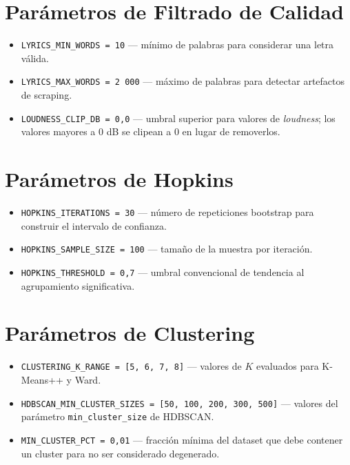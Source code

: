 \section{Parámetros de Filtrado de Calidad}

\begin{itemize}[leftmargin=2em]
    \item \texttt{LYRICS\_MIN\_WORDS = 10} --- mínimo de palabras para considerar una letra válida.
    \item \texttt{LYRICS\_MAX\_WORDS = 2\,000} --- máximo de palabras para detectar artefactos de scraping.
    \item \texttt{LOUDNESS\_CLIP\_DB = 0{,}0} --- umbral superior para valores de \textit{loudness}; los valores mayores a 0 dB se clipean a 0 en lugar de removerlos.
\end{itemize}

\section{Parámetros de Hopkins}

\begin{itemize}[leftmargin=2em]
    \item \texttt{HOPKINS\_ITERATIONS = 30} --- número de repeticiones bootstrap para construir el intervalo de confianza.
    \item \texttt{HOPKINS\_SAMPLE\_SIZE = 100} --- tamaño de la muestra por iteración.
    \item \texttt{HOPKINS\_THRESHOLD = 0{,}7} --- umbral convencional de tendencia al agrupamiento significativa.
\end{itemize}

\section{Parámetros de Clustering}

\begin{itemize}[leftmargin=2em]
    \item \texttt{CLUSTERING\_K\_RANGE = [5, 6, 7, 8]} --- valores de $K$ evaluados para K-Means++ y Ward.
    \item \texttt{HDBSCAN\_MIN\_CLUSTER\_SIZES = [50, 100, 200, 300, 500]} --- valores del parámetro \texttt{min\_cluster\_size} de HDBSCAN.
    \item \texttt{MIN\_CLUSTER\_PCT = 0{,}01} --- fracción mínima del dataset que debe contener un cluster para no ser considerado degenerado.
\end{itemize}

